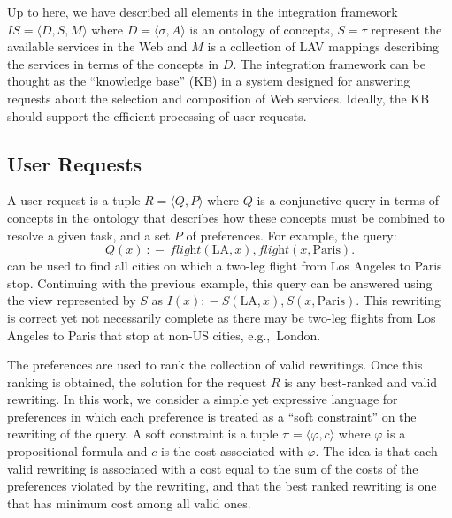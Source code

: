 \documentclass{llncs}
\newcommand{\tup}[1]{\langle #1 \rangle}
\newcommand{\qrule}{:\!\!-}
\newcommand{\flight}{\textit{flight}}
\newcommand{\PA}{\text{Paris}}
\newcommand{\LA}{\text{LA}}
\begin{document}
Up to here, we have described all elements in the integration framework
$IS=\tup{D,S,M}$ where $D=\tup{\sigma,A}$ is an ontology of concepts, 
$S=\tau$ represent the available services in the Web and $M$ is a
collection of LAV mappings describing the services in terms of the
concepts in $D$.
The integration framework can be thought as the ``knowledge base'' (KB)
in a system designed for answering requests about the selection and
composition of Web services.
Ideally, the KB should support the efficient processing of user requests.

\subsection{User Requests}

A user request is a tuple $R=\tup{Q,P}$ where $Q$ is a conjunctive query
in terms of concepts in the ontology that describes how these concepts
must be combined to resolve a given task, and a set $P$ of preferences.
For example, the query:
\[ Q(x)\ \qrule\ \flight(\LA,x), \flight(x,\PA). \]
can be used to find all cities on which a two-leg flight
from Los Angeles to Paris stop. Continuing with the previous example,
this query can be answered using the view represented by $S$
as $I(x) \qrule S(\LA,x), S(x,\PA)$. This rewriting is correct yet
not necessarily complete as there may be two-leg flights from
Los Angeles to Paris that stop at non-US cities, e.g.,\ London.

The preferences are used to rank the collection of valid rewritings.
Once this ranking is obtained, the solution for the request $R$ is
any best-ranked and valid rewriting.
In this work, we consider a simple yet expressive language for 
preferences in which each preference is treated as a ``soft constraint''
on the rewriting of the query.
A soft constraint is a tuple $\pi=\tup{\varphi,c}$ where $\varphi$
is a propositional formula and $c$ is the cost associated with $\varphi$.
The idea is that each valid rewriting is associated with a cost equal to
the sum of the costs of the preferences violated by the rewriting,
and that the best ranked rewriting is one that has minimum cost among
all valid ones.
\end{document}
